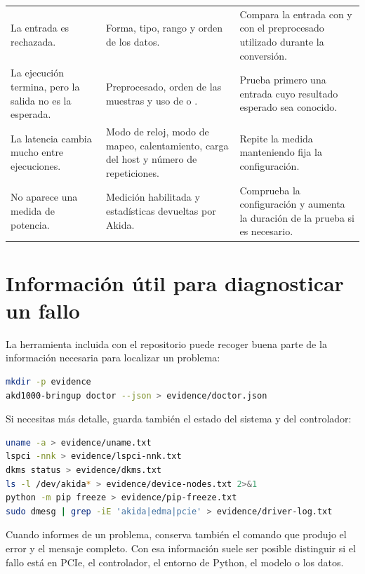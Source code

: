 \begin{longtable}{@{}L{0.25\textwidth}L{0.34\textwidth}L{0.33\textwidth}@{}}
La entrada es rechazada. &
Forma, tipo, rango y orden de los datos. &
Compara la entrada con  y con el preprocesado utilizado durante
la conversión. \\

La ejecución termina, pero la salida no es la esperada. &
Preprocesado, orden de las muestras y uso de  o . &
Prueba primero una entrada cuyo resultado esperado sea conocido. \\

La latencia cambia mucho entre ejecuciones. &
Modo de reloj, modo de mapeo, calentamiento, carga del host y número de repeticiones. &
Repite la medida manteniendo fija la configuración. \\

No aparece una medida de potencia. &
Medición habilitada y estadísticas devueltas por Akida. &
Comprueba la configuración y aumenta la duración de la prueba si es necesario. \\

\bottomrule
\end{longtable}

\section{Información útil para diagnosticar un fallo}

La herramienta incluida con el repositorio puede recoger buena parte de la información
necesaria para localizar un problema:

\begin{lstlisting}[language=bash]
mkdir -p evidence
akd1000-bringup doctor --json > evidence/doctor.json
\end{lstlisting}

Si necesitas más detalle, guarda también el estado del sistema y del controlador:

\begin{lstlisting}[language=bash]
uname -a > evidence/uname.txt
lspci -nnk > evidence/lspci-nnk.txt
dkms status > evidence/dkms.txt
ls -l /dev/akida* > evidence/device-nodes.txt 2>&1
python -m pip freeze > evidence/pip-freeze.txt
sudo dmesg | grep -iE 'akida|edma|pcie' > evidence/driver-log.txt
\end{lstlisting}

Cuando informes de un problema, conserva también el comando que produjo el error y el
mensaje completo. Con esa información suele ser posible distinguir si el fallo está en
PCIe, el controlador, el entorno de Python, el modelo o los datos.